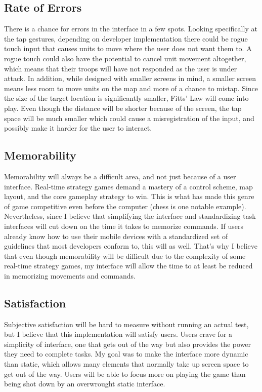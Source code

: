 \documentclass[11pt]{article}
\begin{document}
	\subsection{Rate of Errors}
	There is a chance for errors in the interface in a few spots. Looking specifically at the tap gestures, depending on developer implementation there could be rogue touch input that causes units to move where the user does not want them to. A rogue touch could also have the potential to cancel unit movement altogether, which means that their troops will have not responded as the user is under attack. In addition, while designed with smaller screens in mind, a smaller screen means less room to move units on the map and more of a chance to mistap. Since the size of the target location is significantly smaller, Fitts' Law will come into play. Even though the distance will be shorter because of the screen, the tap space will be much smaller which could cause a misregistration of the input, and possibly make it harder for the user to interact.
	\subsection{Memorability}
	Memorability will always be a difficult area, and not just because of a user interface. Real-time strategy games demand a mastery of a control scheme, map layout, and the core gameplay strategy to win. This is what has made this genre of game competitive even before the computer (chess is one notable example). Nevertheless, since I believe that simplifying the interface and standardizing task interfaces will cut down on the time it takes to memorize commands. If users already know how to use their mobile devices with a standardized set of guidelines that most developers conform to, this will as well. That's why I believe that even though memorability will be difficult due to the complexity of some real-time strategy games, my interface will allow the time to at least be reduced in memorizing movements and commands.
	\subsection{Satisfaction}
	Subjective satisfaction will be hard to measure without running an actual test, but I believe that this implementation will satisfy users. Users crave for a simplicity of interface, one that gets out of the way but also provides the power they need to complete tasks. My goal was to make the interface more dynamic than static, which allows many elements that normally take up screen space to get out of the way. Users will be able to focus more on playing the game than being shot down by an overwrought static interface.
\end{document}
